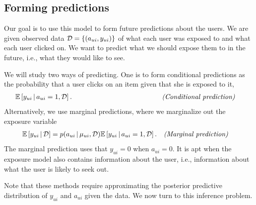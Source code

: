 \subsection{Forming predictions}  

Our goal is to use this model to form
future predictions about the users.  We are given observed data
$\mathcal{D} = \{(a_{ui}, y_{ui})\}$ of what each user was exposed to and
what each user clicked on.  We want to predict what we should expose
them to in the future, i.e., what they would like to see.

We will study two ways of predicting. One is to form conditional
predictions as the probability that a user clicks on an item given
that she is exposed to it,
\begin{align}
  &\mathbb{E}\left[y_{ui} \,\vert\, a_{ui} = 1, \mathcal{D}\right].  &\quad\quad\quad\quad\quad\quad\quad\quad\quad\quad\quad\quad\textit{(Conditional prediction)}&
  \label{eq:conditional-prediction}
\end{align}
Alternatively, we use marginal predictions, where we marginalize out
the exposure variable
\begin{align}
  &\mathbb{E}\left[y_{ui} \,\vert\, \mathcal{D}\right] = p(a_{ui} \,\vert\, \mu_{ui}, \mathcal{D}) \mathbb{E}\left[y_{ui} \,\vert\, a_{ui} =
  1, \mathcal{D}\right]. & \textit{(Marginal prediction)}&
  \label{eq:marginal_preds}
\end{align}
The marginal prediction uses that $y_{ui} = 0$ when $a_{ui} = 0$.  It
is apt when the exposure model also contains information about the
user, i.e., information about what the user is likely to seek out.





Note that these methods require approximating the posterior predictive
distribution of $y_{ui}$ and $a_{ui}$ given the data.  We now turn to
this inference problem.



